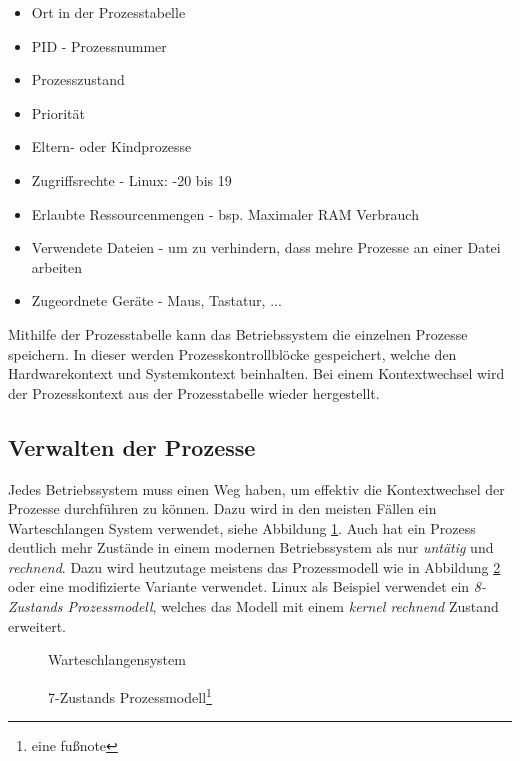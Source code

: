 \begin{itemize}
    \setlength\itemsep{0pt}
    \item Ort in der Prozesstabelle
    \item PID - Prozessnummer
    \item Prozesszustand
    \item Priorität
    \item Eltern- oder Kindprozesse
    \item Zugriffsrechte - Linux: -20 bis 19
    \item Erlaubte Ressourcenmengen - bsp. Maximaler RAM Verbrauch
    \item Verwendete Dateien - um zu verhindern, dass mehre Prozesse an einer Datei arbeiten
    \item Zugeordnete Geräte - Maus, Tastatur, ...
\end{itemize}

Mithilfe der Prozesstabelle kann das Betriebssystem die einzelnen Prozesse speichern. In dieser werden Prozesskontrollblöcke gespeichert, welche den Hardwarekontext und Systemkontext beinhalten. Bei einem Kontextwechsel wird der Prozesskontext aus der Prozesstabelle wieder hergestellt.

\newpage

\subsection{Verwalten der Prozesse}

Jedes Betriebssystem muss einen Weg haben, um effektiv die Kontextwechsel der Prozesse durchführen zu können. Dazu wird in den meisten Fällen ein Warteschlangen System verwendet, siehe Abbildung \ref{Warteschlange Prozesse}. Auch hat ein Prozess deutlich mehr Zustände in einem modernen Betriebssystem als nur \textit{untätig} und \textit{rechnend}. Dazu wird heutzutage meistens das Prozessmodell wie in Abbildung \ref{Prozessmodell} oder eine modifizierte Variante verwendet. Linux als Beispiel verwendet ein \textit{8-Zustands Prozessmodell}, welches das Modell mit einem \textit{kernel rechnend} Zustand erweitert.

\begin{figure}[h]
    \centering
    
    \caption{Warteschlangensystem\protect\footnotemark}
    \label{Warteschlange Prozesse}
\end{figure}
\begin{figure}[h]
    \centering
    
    \caption{7-Zustands Prozessmodell\protect\footnote{eine fußnote}}
    \label{Prozessmodell}
\end{figure}

